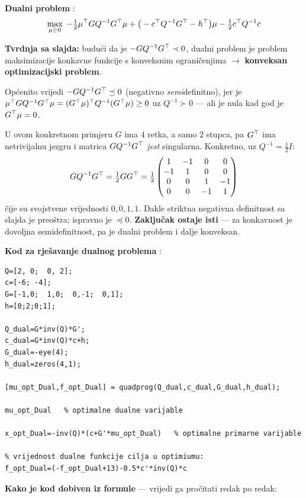 \textbf{Dualni problem} :
\[
\max_{\mu \ge 0}\;
-\tfrac12\mu^{\top} GQ^{-1}G^{\top}\mu + \big(-c^{\top} Q^{-1}G^{\top} - h^{\top}\big)\mu
- \tfrac12 c^{\top} Q^{-1}c
\]

\textbf{Tvrdnja sa slajda:} budući da je $-GQ^{-1}G^{\top} \prec 0$, dualni problem
je problem maksimizacije konkavne funkcije s konveksnim ograničenjima
$\to$ \textbf{konveksan optimizacijski problem}.

\begin{napomena}
Općenito vrijedi $-GQ^{-1}G^{\top} \preceq 0$ (negativno \emph{semi}definitno), jer
je $\mu^{\top} GQ^{-1}G^{\top}\mu = (G^{\top}\mu)^{\top} Q^{-1}(G^{\top}\mu) \ge 0$ uz $Q^{-1} \succ 0$
--- ali je nula kad god je $G^{\top}\mu = 0$.

U ovom konkretnom primjeru $G$ ima $4$ retka, a samo $2$ stupca, pa $G^{\top}$ ima
netrivijalnu jezgru i matrica $GQ^{-1}G^{\top}$ \emph{jest} singularna. Konkretno,
uz $Q^{-1} = \tfrac12 I$:
\[
GQ^{-1}G^{\top} = \tfrac12 GG^{\top} = \tfrac12
\begin{pmatrix}
 1 & -1 & 0 & 0 \\
-1 & 1 & 0 & 0 \\
 0 & 0 & 1 & -1 \\
 0 & 0 & -1 & 1
\end{pmatrix}
\]
čije su svojstvene vrijednosti $0, 0, 1, 1$. Dakle striktna negativna
definitnost sa slajda je preoštra; ispravno je $\preceq 0$. \textbf{Zaključak
ostaje isti} --- za konkavnost je dovoljna semidefinitnost, pa je dualni
problem i dalje konveksan.
\end{napomena}

\textbf{Kod za rješavanje dualnog problema} :

\begin{verbatim}
Q=[2, 0;  0, 2];
c=[-6; -4];
G=[-1,0;  1,0;  0,-1;  0,1];
h=[0;2;0;1];

Q_dual=G*inv(Q)*G';
c_dual=G*inv(Q)*c+h;
G_dual=-eye(4);
h_dual=zeros(4,1);

[mu_opt_Dual,f_opt_Dual] = quadprog(Q_dual,c_dual,G_dual,h_dual);

mu_opt_Dual   % optimalne dualne varijable

x_opt_Dual=-inv(Q)*(c+G'*mu_opt_Dual)   % optimalne primarne varijable

% vrijednost dualne funkcije cilja u optimiumu:
f_opt_Dual=(-f_opt_Dual+13)-0.5*c'*inv(Q)*c
\end{verbatim}

\textbf{Kako je kod dobiven iz formule} --- vrijedi ga pročitati redak po redak:

